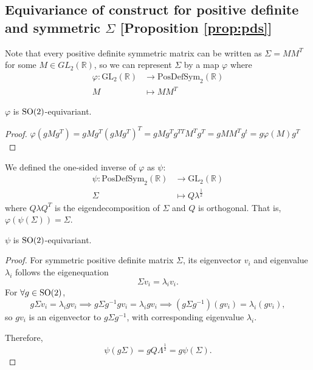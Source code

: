 \subsection{Equivariance of construct for positive definite and symmetric $\Sigma$ [Proposition \ref{prop:pds}]}


Note that every positive definite symmetric matrix can be written as $\Sigma = MM^T$ for some $M\in GL_2(\mathbb{R})$, so we can represent $\Sigma$ by a map $\varphi$ where
\begin{align*}
       \varphi \colon \mathrm{GL}_2(\mathbb{R}) &\to \mathrm{PosDefSym}_2(\mathbb{R})  \\ 
    M &\mapsto M M^T
\end{align*}

\begin{prop*}
$\varphi$ is $\mathrm{SO}(2)$-equivariant.
\end{prop*}
\begin{proof}
$\varphi (gMg^T) = gMg^T (gMg^T)^T = gMg^T g^{TT} M^T g^T = gMM^Tg^t = g\varphi(M)g^T $
\end{proof}

We defined the one-sided inverse of $\varphi$ as $\psi$:
\begin{align*}
        \psi \colon \mathrm{PosDefSym}_2(\mathbb{R}) &\to \mathrm{GL}_2(\mathbb{R})    \\ 
        \Sigma &\mapsto Q \lambda^{\frac{1}{2}}
\end{align*}
where $Q\lambda Q^T$ is the eigendecomposition of $\Sigma$ and $Q$ is orthogonal.   That is, $\varphi (\psi(\Sigma)) = \Sigma$.
\begin{prop*}
$\psi$ is $\mathrm{SO}(2)$-equivariant.
\end{prop*}
\begin{proof}
For symmetric positive definite matrix $\Sigma$, its eigenvector $v_i$ and eigenvalue $\lambda_i$ follows the eigenequation
\[
    \Sigma v_i = \lambda_i v_i .
\]
For $\forall g \in \mathrm{SO}(2)$, 
\[
  g\Sigma v_i = \lambda_i g v_i \implies g\Sigma g^{-1} g v_i = \lambda_i g v_i \implies (g\Sigma g^{-1}) (g v_i) = \lambda_i (g v_i) ,
\]
so $gv_i$ is an eigenvector to $g\Sigma g^{-1}$, with corresponding eigenvalue $\lambda_i$.

Therefore, 
\[
\psi (g\Sigma) = gQ\Lambda^{\frac{1}{2}} = g\psi (\Sigma).
\]
\end{proof}

